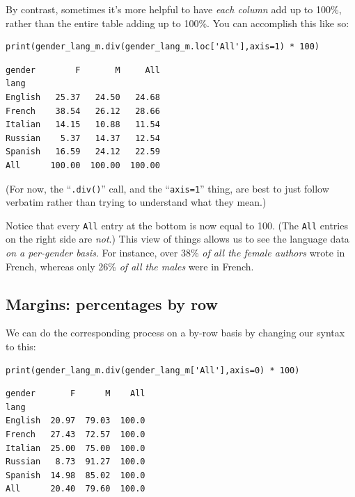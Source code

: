 By contrast, sometimes it's more helpful to have \textit{each column} add up to
100\%, rather than the entire table adding up to 100\%. You can accomplish this
like so:


\begin{Verbatim}[fontsize=\footnotesize,samepage=true,frame=single,framesep=3mm]
print(gender_lang_m.div(gender_lang_m.loc['All'],axis=1) * 100)
\end{Verbatim}
\vspace{-.2in}

\begin{Verbatim}[fontsize=\small,samepage=true,frame=leftline,framesep=5mm,framerule=1mm]
gender        F       M     All
lang
English   25.37   24.50   24.68
French    38.54   26.12   28.66
Italian   14.15   10.88   11.54
Russian    5.37   14.37   12.54
Spanish   16.59   24.12   22.59
All      100.00  100.00  100.00
\end{Verbatim}

(For now, the ``\texttt{.div()}'' call, and the ``\texttt{axis=1}'' thing, are
best to just follow verbatim rather than trying to understand what they mean.)

Notice that every \texttt{All} entry at the bottom is now equal to 100.
(The \texttt{All} entries on the right side are \textit{not}.) This view of
things allows us to see the language data \textit{on a per-gender basis}. For
instance, over 38\% \textit{of all the female authors} wrote in French, whereas
only 26\% \textit{of all the males} were in French.

\subsection{Margins: percentages by row}

We can do the corresponding process on a by-row basis by changing our syntax to
this:



\begin{Verbatim}[fontsize=\footnotesize,samepage=true,frame=single,framesep=3mm]
print(gender_lang_m.div(gender_lang_m['All'],axis=0) * 100)
\end{Verbatim}
\vspace{-.2in}

\begin{Verbatim}[fontsize=\small,samepage=true,frame=leftline,framesep=5mm,framerule=1mm]
gender       F      M    All
lang
English  20.97  79.03  100.0
French   27.43  72.57  100.0
Italian  25.00  75.00  100.0
Russian   8.73  91.27  100.0
Spanish  14.98  85.02  100.0
All      20.40  79.60  100.0
\end{Verbatim}

